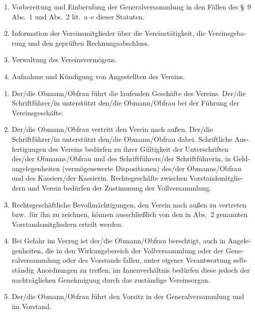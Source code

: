 \begin{otherlanguage}{german}
\begin{enumerate}[statutenenum]
    \item Vorbereitung und Einberufung der Generalversammlung in den Fällen des \S\ 9 Abs.\ 1 und Abs.\ 2 lit.\ a--c dieser Statuten.

    \item Information der Vereinsmitglieder über die Vereinstätigkeit, die Vereinsgebarung und den geprüften Rechnungsabschluss.

    \item Verwaltung des Vereinsvermögens.

    \item Aufnahme und Kündigung von Angestellten des Vereins.
\end{enumerate}


\begin{enumerate}[statutenenum]
    \item Der/die Obmann/Obfrau führt die laufenden Geschäfte des Vereins.
        Der/die Schriftführer/in unterstützt den/die Obmann/Obfrau bei der Führung der Vereinsgeschäfte.

    \item Der/die Obmann/Obfrau vertritt den Verein nach außen.
        Der/die Schriftführer/in unterstützt den/die Obmann/Obfrau dabei.
        Schriftliche Ausfertigungen des Vereins bedürfen zu ihrer Gültigkeit der Unterschriften des/der Obmanns/Obfrau und des Schriftführers/der Schriftführerin, in Geldangelegenheiten (vermögenswerte Dispositionen) des/der Obmanns/Obfrau und des Kassiers/der Kassierin.
        Rechtsgeschäfte zwischen Vorstandsmitgliedern und Verein bedürfen der Zustimmung der Vollversammlung.

    \item Rechtsgeschäftliche Bevollmächtigungen, den Verein nach außen zu vertreten bzw.\ für ihn zu zeichnen, können ausschließlich von den in Abs.\ 2 genannten Vorstandsmitgliedern erteilt werden.

    \item Bei Gefahr im Verzug ist der/die Obmann/Obfrau berechtigt, auch in Angelegenheiten, die in den Wirkungsbereich der Vollversammlung oder der Generalversammlung oder des Vorstands fallen, unter eigener Verantwortung selbständig Anordnungen zu treffen;
        im Innenverhältnis bedürfen diese jedoch der nachträglichen Genehmigung durch das zuständige Vereinsorgan.

    \item Der/die Obmann/Obfrau führt den Vorsitz in der Generalversammlung und im Vorstand.


\end{enumerate}
\end{otherlanguage}
